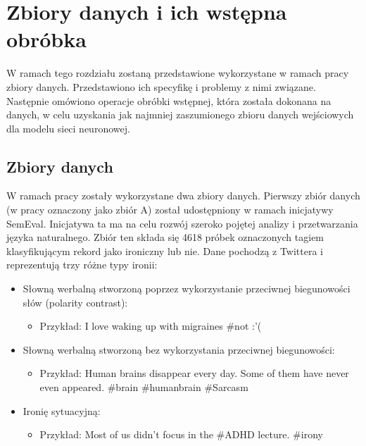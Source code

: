 \newpage %
\section{Zbiory danych i ich wstępna obróbka} \label{dane_wejsciowe}

W ramach tego rozdziału zostaną przedstawione wykorzystane w ramach pracy zbiory danych. Przedstawiono ich specyfikę i problemy z nimi związane. Następnie omówiono operacje obróbki wstępnej, która została dokonana na danych, w celu uzyskania jak najmniej zaszumionego zbioru danych wejściowych dla modelu sieci neuronowej. 

\subsection{Zbiory danych} \label{dane_wejsciowe}



W ramach pracy zostały wykorzystane dwa zbiory danych. Pierwszy zbiór danych (w pracy oznaczony jako zbiór A) został udostępniony w ramach inicjatywy SemEval. Inicjatywa ta ma na celu rozwój szeroko pojętej analizy i przetwarzania języka naturalnego. Zbiór ten składa się 4618 próbek oznaczonych tagiem klasyfikującym rekord jako ironiczny lub nie. Dane pochodzą z Twittera i reprezentują trzy różne typy ironii:
\begin{itemize}
    \item Słowną werbalną stworzoną poprzez wykorzystanie przeciwnej biegunowości słów (polarity contrast):
          \begin{itemize}
              \item Przykład: I love waking up with migraines \#not :'(
          \end{itemize}

    \item Słowną werbalną stworzoną bez wykorzystania przeciwnej biegunowości:
          \begin{itemize}
              \item Przykład: Human brains disappear every day. Some of them have never even appeared. \#brain \#humanbrain \#Sarcasm
          \end{itemize}

    \item Ironię sytuacyjną:
          \begin{itemize}
              \item Przykład: Most of us didn't focus in the \#ADHD lecture. \#irony
          \end{itemize}
\end{itemize}

